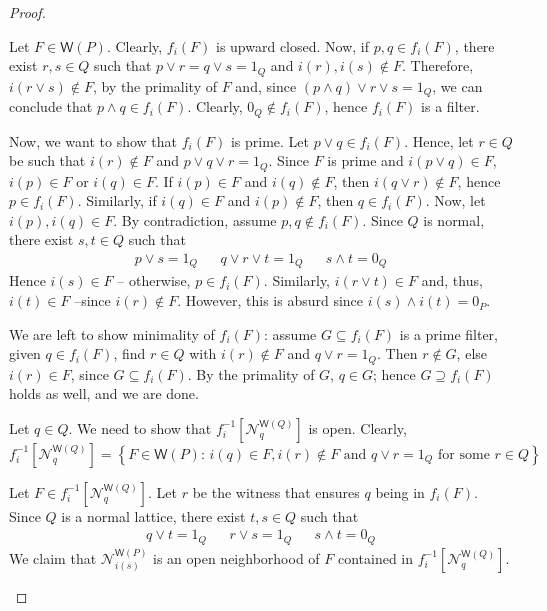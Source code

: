 \documentclass{article}
\newcommand{\opencorn}[2]{\mathcal{N}^{\mathsf{W}(#1)}_{#2}}
\theoremstyle{plain}
\theoremstyle{definition}
\theoremstyle{remark}
\newcommand{\bp}[1]{\left\lbrace #1 \right\rbrace}
\newcommand{\0}{\mathbbm 0}
\newcommand{\1}{\mathbbm 1}
\newcommand{\2}{\mathbbm 2}
\begin{document}
\begin{proof} $ $

    \begin{description}[font=\normalfont\itshape]
    
  \item[$f_i$ is well defined.] 
    Let $F \in \mathsf{W}(P)$. Clearly, $f_i(F)$ is upward closed. Now, if $p, q \in f_i(F)$, there exist $r,s \in Q$ such that $p \vee r=q \vee s=1_Q$ and $i(r),i(s) \notin F$. Therefore, $i(r \vee s) \notin F $, by the primality of $F$ and, since $(p \wedge q) \vee r \vee s=1_Q$, we can conclude that $p \wedge q \in f_i(F)$. Clearly, $0_Q \notin f_i(F)$, hence $f_i(F)$ is a filter. 
    
    Now, we want to show that $f_i(F)$ is prime. Let $p \vee q \in f_i(F)$. Hence, let $r \in Q$ be such that $i(r) \notin F$ and $p \vee q \vee r=1_Q$. Since $F$ is prime and $i(p \vee q) \in F$, $i(p) \in F$ or $i(q) \in F$. If $i(p) \in F$ and $i(q) \notin F$, then $i(q \vee r) \notin F$, hence $p \in f_i(F)$. Similarly, if $i(q) \in F$ and $i(p) \notin F$, then $q \in f_i(F)$. Now, let $i(p),i(q) \in F$. By contradiction, assume $p,q \notin f_i(F)$. Since $Q$ is normal, there exist $s,t \in Q$ such that
    \begin{align*}
        p \vee s =1_Q && q \vee r \vee t=1_Q && s \wedge t=0_Q
    \end{align*}
    Hence $i(s)\in F$ -- otherwise, $p \in f_i(F)$. Similarly, $i(r \vee t) \in F$ and, thus, $i(t) \in F$ --since $i(r) \notin F$. However, this is absurd since $i(s) \wedge i(t)=0_P$.
    
    We are left to show minimality of $ f_i(F)$: assume $G\subseteq f_i(F)$ is a prime filter, given $q\in f_i(F)$, find $r\in Q$ with $i(r)\not\in F$ and $q\vee r=1_Q$. Then $r\not\in G$, else
$i(r)\in F$, since $G\subseteq f_i(F)$. By the primality of $G$, $q\in G$; hence $G\supseteq f_i(F)$ holds as well, and we are done.

    
  \item[$f_i$ is continuous.] Let $q\in Q$. We need to show  that $f_i^{-1}[\opencorn{Q}{q}]$ is open. Clearly, 
\[
f_i^{-1}[\opencorn{Q}{q}]=\bp{F \in \mathsf{W}(P) : \, i(q) \in F, i(r) \notin F \text{ and } q \vee r=1_Q \text{ for some } r \in Q}\] 

  Let $F \in f_i^{-1}[\opencorn{Q}{q}]$. Let $r$ be the witness that ensures $q$ being in $f_i(F)$. Since $Q$ is a normal lattice,  there exist $t,s \in Q$ such that \begin{align*}
        q \vee t = 1_Q && r \vee  s = 1_Q && s \wedge t =0_Q
    \end{align*}
    We claim  that $\opencorn{P}{i(s)}$ is an open neighborhood of $F$ contained in $f_i^{-1}[\opencorn{Q}{q}]$.
    

\end{description}
\end{proof}
\end{document}
